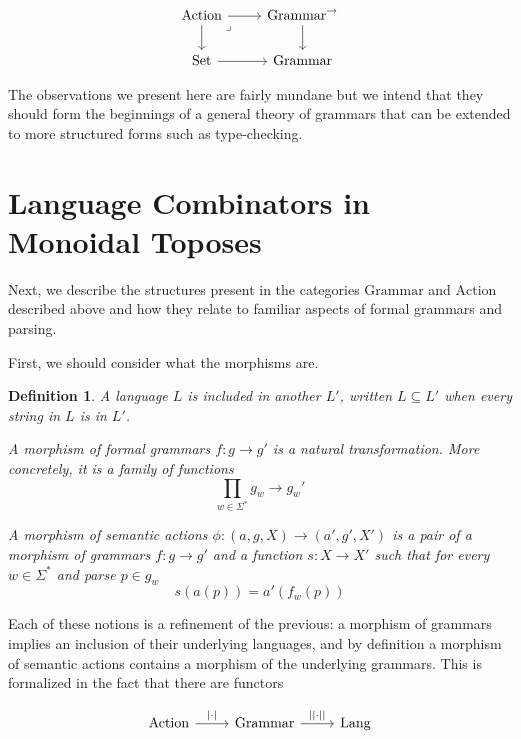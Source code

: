 \documentclass[12pt]{article}
\newcommand{\Set}{\textrm{Set}}
\newcommand{\Lang}{\textrm{Lang}}
\newcommand{\Grammar}{\textrm{Grammar}}
\newcommand{\Action}{\textrm{Action}}
\newtheorem{definition}{Definition}
\begin{document}
\[\begin{tikzcd}
	\Action & {\Grammar^\to} \\
	\Set & \Grammar
	\arrow[from=1-1, to=2-1]
	\arrow[from=2-1, to=2-2]
	\arrow[from=1-1, to=1-2]
	\arrow[from=1-2, to=2-2]
	\arrow["\lrcorner"{anchor=center, pos=0.125}, draw=none, from=1-1, to=2-2]
\end{tikzcd}\]

The observations we present here are fairly mundane but we intend that
they should form the beginnings of a general theory of grammars that
can be extended to more structured forms such as type-checking.

\section{Language Combinators in Monoidal Toposes}

Next, we describe the structures present in the categories $\Grammar$
and $\Action$ described above and how they relate to familiar aspects
of formal grammars and parsing.

First, we should consider what the morphisms are.

\begin{definition}
  A language $L$ is included in another $L'$, written $L \subseteq L'$
  when every string in $L$ is in $L'$.
  
  A morphism of formal grammars $f : g \to g'$ is a natural
  transformation. More concretely, it is a family of functions
  \[ \prod_{w \in \Sigma^*} g_w \to g_w' \]

  A morphism of semantic actions $\phi : (a,g,X) \to (a', g', X')$ is
  a pair of a morphism of grammars $f : g \to g'$ and a function $s :
  X \to X'$ such that for every $w \in \Sigma^*$ and parse $p \in g_w$
  \[ s(a(p)) = a'(f_w(p)) \]
\end{definition}

Each of these notions is a refinement of the previous: a morphism of
grammars implies an inclusion of their underlying languages, and by
definition a morphism of semantic actions contains a morphism of the
underlying grammars. This is formalized in the fact that there are
functors

\[\begin{tikzcd}
	\Action & \Grammar & \Lang
	\arrow["{|\cdot|}", from=1-1, to=1-2]
	\arrow["{||\cdot||}", from=1-2, to=1-3]
\end{tikzcd}\]
\end{document}
